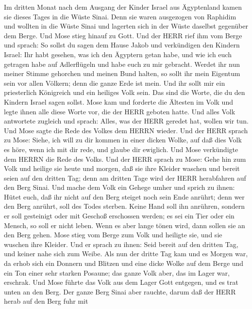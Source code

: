  Im dritten Monat nach dem Ausgang der Kinder Israel aus
Ägyptenland kamen sie dieses Tages in die Wüste Sinai.  Denn
sie waren ausgezogen von Raphidim und wollten in die Wüste Sinai und
lagerten sich in der Wüste daselbst gegenüber dem Berge. 
Und Mose stieg hinauf zu Gott. Und der HERR rief ihm vom Berge und
sprach: So sollst du sagen dem Hause Jakob und verkündigen den Kindern
Israel:  Ihr habt gesehen, was ich den Ägyptern getan habe,
und wie ich euch getragen habe auf Adlerflügeln und habe euch zu mir
gebracht.  Werdet ihr nun meiner Stimme gehorchen und meinen
Bund halten, so sollt ihr mein Eigentum sein vor allen Völkern; denn die
ganze Erde ist mein.  Und ihr sollt mir ein priesterlich
Königreich und ein heiliges Volk sein. Das sind die Worte, die du den
Kindern Israel sagen sollst.  Mose kam und forderte die
Ältesten im Volk und legte ihnen alle diese Worte vor, die der HERR
geboten hatte.  Und alles Volk antwortete zugleich und
sprach: Alles, was der HERR geredet hat, wollen wir tun. Und Mose sagte
die Rede des Volkes dem HERRN wieder.  Und der HERR sprach
zu Mose: Siehe, ich will zu dir kommen in einer dicken Wolke, auf daß
dies Volk es höre, wenn ich mit dir rede, und glaube dir ewiglich. Und
Mose verkündigte dem HERRN die Rede des Volks.  Und der
HERR sprach zu Mose: Gehe hin zum Volk und heilige sie heute und morgen,
daß sie ihre Kleider waschen  und bereit seien auf den
dritten Tag; denn am dritten Tage wird der HERR herabfahren auf den Berg
Sinai.  Und mache dem Volk ein Gehege umher und sprich zu
ihnen: Hütet euch, daß ihr nicht auf den Berg steiget noch sein Ende
anrührt; denn wer den Berg anrührt, soll des Todes sterben.
 Keine Hand soll ihn anrühren, sondern er soll gesteinigt
oder mit Geschoß erschossen werden; es sei ein Tier oder ein Mensch, so
soll er nicht leben. Wenn es aber lange tönen wird, dann sollen sie an
den Berg gehen.  Mose stieg vom Berge zum Volk und heiligte
sie, und sie wuschen ihre Kleider.  Und er sprach zu ihnen:
Seid bereit auf den dritten Tag, und keiner nahe sich zum Weibe.
 Als nun der dritte Tag kam und es Morgen war, da erhob
sich ein Donnern und Blitzen und eine dicke Wolke auf dem Berge und ein
Ton einer sehr starken Posaune; das ganze Volk aber, das im Lager war,
erschrak.  Und Mose führte das Volk aus dem Lager Gott
entgegen, und es trat unten an den Berg.  Der ganze Berg
Sinai aber rauchte, darum daß der HERR herab auf den Berg fuhr mit
